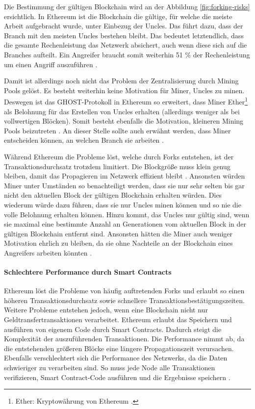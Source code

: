 Die Bestimmung der gültigen Blockchain wird an der Abbildung \ref{fig:forking-risks} ersichtlich. In Ethereum ist die Blockchain die gültige, für welche die meiste Arbeit aufgebracht wurde, unter Einbezug der Uncles. Das führt dazu, dass der Branch mit den meisten Uncles bestehen bleibt. Das bedeutet letztendlich, dass die gesamte Rechenleistung das Netzwerk absichert, auch wenn diese sich auf die Branches aufteilt. Ein Angreifer braucht somit weiterhin 51 \% der Rechenleistung um einen Angriff auszuführen \cite{SompolinskyAcceleratingBitcoinTransaction2013}.

Damit ist allerdings noch nicht das Problem der Zentralisierung durch Mining Pools gelöst. Es besteht weiterhin keine Motivation für Miner, Uncles zu minen. Deswegen ist das GHOST-Protokoll in Ethereum so erweitert, dass Miner Ether\footnote{Ether: Kryptowährung von Ethereum \cite{EthereumTeamEthereumWhitePaper2017}.} als Belohnung für das Erstellen von Uncles erhalten (allerdings weniger als bei vollwertigen Blöcken). Somit besteht ebenfalls die Motivation, kleineren Mining Pools beizutreten \cite{EthereumTeamEthereumWhitePaper2017}. An dieser Stelle sollte auch erwähnt werden, dass Miner entscheiden können, an welchen Branch sie arbeiten \cite{ZhengBlockchainChallengesOpportunities2017}.

Während Ethereum die Probleme löst, welche durch Forks entstehen, ist der Transaktionsdurchsatz trotzdem limitiert. Die Blockgröße muss klein genug bleiben, damit das Propagieren im Netzwerk effizient bleibt \cite{SchererPerformanceScalabilityBlockchain2017}. Ansonsten würden Miner unter Umständen so benachteiligt werden, dass sie nur sehr selten bis gar nicht den aktuellen Block der gültigen Blockchain erhalten würden. Dies wiederum würde dazu führen, dass sie nur Uncles minen können und so nie die volle Belohnung erhalten können. Hinzu kommt, das Uncles nur gültig sind, wenn sie maximal eine bestimmte Anzahl an Generationen vom aktuellen Block in der gültigen Blockchain entfernt sind. Ansonsten hätten die Miner auch weniger Motivation ehrlich zu bleiben, da sie ohne Nachteile an der Blockchain eines Angreifers arbeiten könnten \cite{EthereumTeamEthereumWhitePaper2017}.

\paragraph{Schlechtere Performance durch Smart Contracts}
Ethereum löst die Probleme von häufig auftretenden Forks und erlaubt so einen höheren Transaktionsdurchsatz sowie schnellere Transaktionsbestätigungszeiten. Weitere Probleme entstehen jedoch, wenn eine Blockchain nicht nur Geldtransfertransaktionen verarbeitet. Ethereum erlaubt das Speichern und ausführen von eigenem Code durch Smart Contracts. Dadurch steigt die Komplexität der auszuführenden Transaktionen. Die Performance nimmt ab, da die entstehenden größeren Blöcke eine längere Propagationszeit verursachen. Ebenfalls verschlechtert sich die Performance des Netzwerks, da die Daten schwieriger zu verarbeiten sind. So muss jede Node alle Transaktionen verifizieren, Smart Contract-Code ausführen und die Ergebnisse speichern \cite{SchererPerformanceScalabilityBlockchain2017}. 

